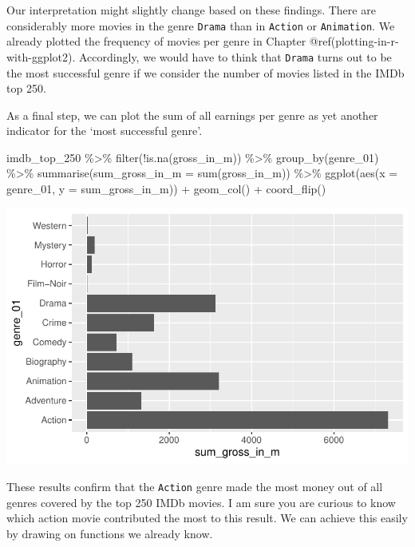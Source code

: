 \documentclass[
  letterpaper,
]{krantz}
\makeatletter
\newenvironment{Shaded}{\begin{snugshade}}{\end{snugshade}}
\newcommand{\AttributeTok}[1]{\textcolor[rgb]{0.40,0.45,0.13}{#1}}
\newcommand{\FunctionTok}[1]{\textcolor[rgb]{0.28,0.35,0.67}{#1}}
\newcommand{\NormalTok}[1]{\textcolor[rgb]{0.00,0.23,0.31}{#1}}
\newcommand{\SpecialCharTok}[1]{\textcolor[rgb]{0.37,0.37,0.37}{#1}}
\newenvironment{kframe}{%
\medskip{}
\setlength{\fboxsep}{.8em}
 \def\at@end@of@kframe{}%
 \ifinner\ifhmode%
  \def\at@end@of@kframe{\end{minipage}}%
  \begin{minipage}{\columnwidth}%
 \fi\fi%
 \def\FrameCommand##1{\hskip\@totalleftmargin \hskip-\fboxsep
 \colorbox{shadecolor}{##1}\hskip-\fboxsep
     \hskip-\linewidth \hskip-\@totalleftmargin \hskip\columnwidth}%
 \MakeFramed {\advance\hsize-\width
   \@totalleftmargin\z@ \linewidth\hsize
   \@setminipage}}%
 {\par\unskip\endMakeFramed%
 \at@end@of@kframe}
\renewenvironment{Shaded}{\begin{kframe}}{\end{kframe}}
\makeatother
\begin{document}
Our interpretation might slightly change based on these findings. There
are considerably more movies in the genre \texttt{Drama} than in
\texttt{Action} or \texttt{Animation}. We already plotted the frequency
of movies per genre in Chapter @ref(plotting-in-r-with-ggplot2).
Accordingly, we would have to think that \texttt{Drama} turns out to be
the most successful genre if we consider the number of movies listed in
the IMDb top 250.

As a final step, we can plot the sum of all earnings per genre as yet
another indicator for the `most successful genre'.

\begin{Shaded}
\begin{Highlighting}[]
\NormalTok{imdb\_top\_250 }\SpecialCharTok{\%\textgreater{}\%}
  \FunctionTok{filter}\NormalTok{(}\SpecialCharTok{!}\FunctionTok{is.na}\NormalTok{(gross\_in\_m)) }\SpecialCharTok{\%\textgreater{}\%}
  \FunctionTok{group\_by}\NormalTok{(genre\_01) }\SpecialCharTok{\%\textgreater{}\%}
  \FunctionTok{summarise}\NormalTok{(}\AttributeTok{sum\_gross\_in\_m =} \FunctionTok{sum}\NormalTok{(gross\_in\_m)) }\SpecialCharTok{\%\textgreater{}\%}
  \FunctionTok{ggplot}\NormalTok{(}\FunctionTok{aes}\NormalTok{(}\AttributeTok{x =}\NormalTok{ genre\_01, }\AttributeTok{y =}\NormalTok{ sum\_gross\_in\_m)) }\SpecialCharTok{+}
  \FunctionTok{geom\_col}\NormalTok{() }\SpecialCharTok{+}
  \FunctionTok{coord\_flip}\NormalTok{()}
\end{Highlighting}
\end{Shaded}

\includegraphics{08_descriptive_statistics_files/figure-pdf/sum-earnings-per-genre-1.pdf}

These results confirm that the \texttt{Action} genre made the most money
out of all genres covered by the top 250 IMDb movies. I am sure you are
curious to know which action movie contributed the most to this result.
We can achieve this easily by drawing on functions we already know.
\end{document}
